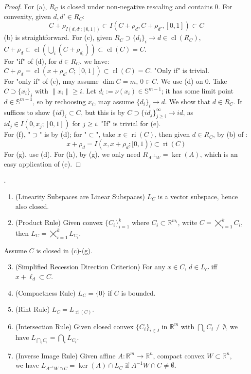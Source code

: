 \begin{proof}
	For (a), $R_C$ is closed under non-negative rescaling and contains $0$. For convexity, given $d,d'\in R_C$:
	\[
		C+\rho_{I(d,d';[0,1])}\subset I\left(C+\rho_{d},C+\rho_{d'},[0,1]\right)\subset C
	\]
	(b) is straightforward. For (c), given $R_C\supset \{d_i\}_i\to d\in \operatorname{cl}(R_C)$, $C+\rho_d\subset \operatorname{cl}\left(\bigcup_i\left(C+\rho_{d_i}\right)\right)\subset \operatorname{cl}(C)=C$.\\
	For "if" of (d), for $d\in R_C$, we have: $C+\rho_d=\operatorname{cl}\left(x+\rho_d,C;[0,1]\right)\subset \operatorname{cl}(C)=C$. "Only if" is trivial.\\
	For "only if" of (e), may assume $\dim C=m$, $0\in C$. We use (d) on $0$. Take $C\supset \{x_i\}_i$ with $\|x_i\|\geq i$. Let $d_i:=\nu(x_i)\in \mathbb{S}^{m-1}$; it has some limit point $d\in \mathbb{S}^{m-1}$, so by rechoosing $x_i$, may assume $\{d_i\}_i\to d$. We show that $d\in R_C$. It suffices to show $\{id\}_i\subset C$, but this is by $C\supset\{id_j\}_{j\geq i}^\infty\to id$, as $id_j\in I(0,x_j;[0,1])$ for $j\geq i$. "If" is trivial for (e).\\
	For (f), "$\supset$" is by (d); for "$\subset$", take $x\in \operatorname{ri}(C)$, then given $d\in R_C$, by (b) of :
	\[
		x+\rho_d = I(x,x+\rho_d;[0, 1))\subset \operatorname{ri}(C)
	\]
	For (g), use (d). For (h), by (g), we only need $R_{A^{-1}W}=\operatorname{ker}(A)$, which is an easy application of (e).
\end{proof}

\begin{prop}.
	\label{prop:013-yoga-linearity}
	\begin{enumerate}[label=(\alph*)]
		\item (Linearity Subspaces are Linear Subspaces) $L_C$ is a vector subspace, hence also closed.
		\item (Product Rule) Given convex $\{C_i\}_{i=1}^k$ where $C_i\subset \mathbb{R}^{m_i}$, write $C=\bigtimes_{i=1}^kC_i$, then $L_C=\bigtimes_{i=1}^kL_{C_i}$.
	\end{enumerate}
	Assume $C$ is closed in (c)-(g).
	\begin{enumerate}[label=(\alph*)]
		\setcounter{enumi}{2}
		\item (Simplified Recession Direction Criterion) For any $x\in C$, $d\in L_C$ iff $x+\ell_d\subset C$.
		\item (Compactness Rule) $L_C=\{0\}$ if $C$ is bounded.
		\item (Rint Rule) $L_C=L_{\operatorname{ri}(C)}$.
		\item (Intersection Rule) Given closed convex $\{C_i\}_{i\in I}$ in $\mathbb{R}^m$ with $\bigcap_i{C_i}\neq\emptyset$, we have $L_{\bigcap_iC_i}=\bigcap_iL_{C_i}$.
		\item (Inverse Image Rule) Given affine $A:\mathbb{R}^m\to \mathbb{R}^n$, compact convex $W\subset \mathbb{R}^n$,\\we have $L_{A^{-1}W\cap C}=\operatorname{ker}(A)\cap L_C$ if $A^{-1}W\cap C\neq\emptyset$.
	\end{enumerate}
\end{prop}

